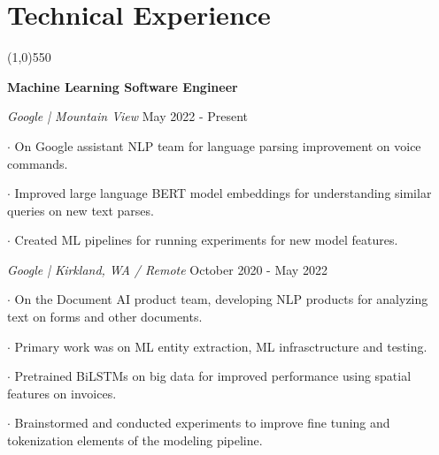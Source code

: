 \documentclass[11pt]{article} %
\begin{document}
	\section*{Technical Experience}
	\vspace{-7ex}
	\begin{center}
    \line(1,0){550}
    \end{center}
    \vspace{-1ex}
    \textbf{\large Machine Learning Software Engineer} %
    \setlength{\parindent}{-0ex} \par
    \textit{Google | Mountain View} \vspace{+1ex} \hfill May 2022 - Present \par
    $\boldsymbol{\cdot}$ On Google assistant NLP team for language parsing improvement on voice commands. \par \vspace{+1ex}
    $\boldsymbol{\cdot}$ Improved large language BERT model embeddings for understanding similar queries on new text parses. \par \vspace{+1ex}
    $\boldsymbol{\cdot}$ Created ML pipelines for running experiments for new model features. \par \vspace{+1ex}
    \textit{Google | Kirkland, WA / Remote} \vspace{+1ex} \hfill October 2020 - May 2022 \par
    $\boldsymbol{\cdot}$ On the Document AI product team, developing NLP products for analyzing text on forms and other documents.  \par \vspace{+1ex}
    $\boldsymbol{\cdot}$ Primary work was on ML entity extraction, ML infrasctructure and testing. \par \vspace{+1ex}
    $\boldsymbol{\cdot}$ Pretrained BiLSTMs on big data for improved performance using spatial features on invoices. \par \vspace{+1ex}
    $\boldsymbol{\cdot}$ Brainstormed and conducted experiments to improve fine tuning and tokenization elements of the modeling pipeline. \par \vspace{+1ex}
    \vspace{+0ex}
\end{document}
